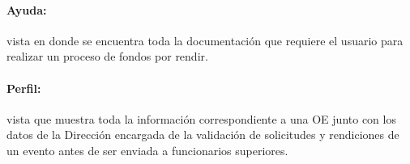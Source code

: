 \paragraph{Ayuda: }vista en donde se encuentra toda la documentación que requiere el usuario para realizar un proceso de fondos por rendir.

\paragraph{Perfil: }vista que muestra toda la información correspondiente a una OE junto con los datos de la Dirección encargada de la validación de solicitudes y rendiciones de un evento antes de ser enviada a funcionarios superiores.